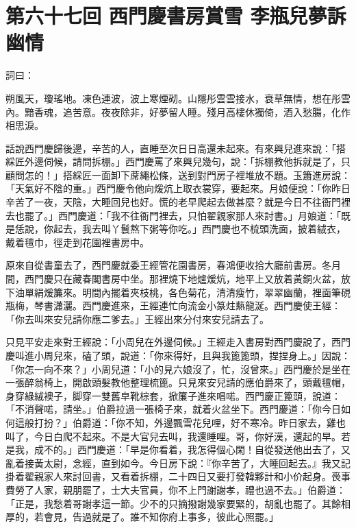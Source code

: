 
\chapter*{第六十七回 西門慶書房賞雪 李瓶兒夢訴幽情}


詞曰：

\begin{myquote} 
朔風天，瓊瑤地。凍色連波，波上寒煙砌。山隱彤雲雲接水，衰草無情，想在彤雲內。黯香魂，追苦意。夜夜除非，好夢留人睡。殘月高樓休獨倚，酒入愁腸，化作相思淚。

\end{myquote} 

話說西門慶歸後邊，辛苦的人，直睡至次日日高還未起來。有來興兒進來說：「搭綵匠外邊伺候，請問拆棚。」西門慶罵了來興兒幾句，說：「拆棚教他拆就是了，只顧問怎的！」{}搭綵匠一面卸下蓆繩松條，送到對門房子裡堆放不題。玉簫進房說：「天氣好不陰的重。」西門慶令他向煖炕上取衣裳穿，要起來。月娘便說：「你昨日辛苦了一夜，天陰，大睡回兒也好。慌的老早爬起去做甚麼？就是今日不往衙門裡去也罷了。」西門慶道：「我不往衙門裡去，只怕翟親家那人來討書。」月娘道：「既是恁說，你起去，我去叫丫鬟熬下粥等你吃。」西門慶也不梳頭洗面，披着絨衣，戴着氊巾，徑走到花園裡書房中。

原來自從書童去了，西門慶就委王經管花園書房，春鴻便收拾大廳前書房。冬月間，西門慶只在藏春閣書房中坐。那裡燒下地爐煖炕，地平上又放着黃銅火盆，放下油單絹煖簾來。明間內擺着夾枝桃，各色菊花，清清瘦竹，翠翠幽蘭，裡面筆硯瓶梅，琴書瀟灑。西門慶進來，王經連忙向流金小篆炷爇龍涎。西門慶使王經：「你去叫來安兒請你應二爹去。」王經出來分付來安兒請去了。

只見平安走來對王經說：「小周兒在外邊伺候。」王經走入書房對西門慶說了，西門慶叫進小周兒來，磕了頭，說道：「你來得好，且與我篦篦頭，捏捏身上。」因說：「你怎一向不來？」小周兒道：「小的見六娘沒了，忙，沒曾來。」西門慶於是坐在一張醉翁椅上，開啟頭髮教他整理梳篦。只見來安兒請的應伯爵來了，頭戴氊帽，身穿綠絨襖子，脚穿一雙舊皁靴棕套，掀簾子進來唱喏。西門慶正篦頭，說道：「不消聲喏，請坐。」伯爵拉過一張椅子來，就着火盆坐下。西門慶道：「你今日如何這般打扮？」伯爵道：「你不知，外邊飄雪花兒哩，好不寒冷。昨日家去，雞也叫了，今日白爬不起來。不是大官兒去叫，我還睡哩。哥，你好漢，還起的早。若是我，成不的。」{}西門慶道：「早是你看着，我怎得個心閑！自從發送他出去了，又亂着接黃太尉，念經，直到如今。今日房下說：『你辛苦了，大睡回起去。』我又記掛着翟親家人來討回書，又看着拆棚，二十四日又要打發韓夥計和小价起身。䘮事費勞了人家，親朋罷了，士大夫官員，你不上門謝謝孝，禮也過不去。」伯爵道：「正是，我愁着哥謝孝這一節。少不的只摘撥謝幾家要緊的，胡亂也罷了。其餘相厚的，若會見，告過就是了。誰不知你府上事多，彼此心照罷。」

